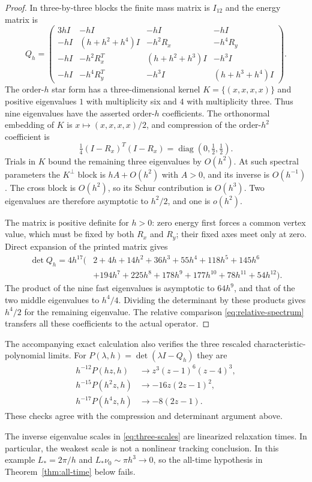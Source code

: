 \begin{proof}
In three-by-three blocks the finite mass matrix is
$I_{12}$ and the energy matrix is
\begin{equation}\label{eq:three-scale-matrix}
 Q_h=\begin{pmatrix}
 3hI&-hI&-hI&-hI\\
 -hI&(h+h^2+h^4)I&-h^2R_x&-h^4R_y\\
 -hI&-h^2R_x^T&(h+h^2+h^3)I&-h^3I\\
 -hI&-h^4R_y^T&-h^3I&(h+h^3+h^4)I
 \end{pmatrix}.
\end{equation}
The order-$h$ star form has a three-dimensional kernel
$K=\{(x,x,x,x)\}$ and positive eigenvalues $1$ with
multiplicity six and $4$ with multiplicity three.
Thus nine eigenvalues have the asserted order-$h$
coefficients. The orthonormal embedding of $K$ is
$x\mapsto(x,x,x,x)/2$, and compression of the
order-$h^2$ coefficient is
\[
 \tfrac14(I-R_x)^T(I-R_x)
 =\operatorname{diag}(0,\tfrac12,\tfrac12).
\]
Trials in $K$ bound the remaining three eigenvalues
by $O(h^2)$. At such spectral parameters the
$K^\perp$ block is $hA+O(h^2)$ with $A>0$, and
its inverse is $O(h^{-1})$. The cross block is
$O(h^2)$, so its Schur contribution is $O(h^3)$.
Two eigenvalues are therefore asymptotic to $h^2/2$,
and one is $o(h^2)$.

The matrix is positive definite for $h>0$: zero
energy first forces a common vertex value, which
must be fixed by both $R_x$ and $R_y$; their fixed
axes meet only at zero. Direct expansion of the
printed matrix gives
\begin{equation}\label{eq:three-scale-det}
 \begin{split}
 \det Q_h=4h^{17}\big(&2+4h+14h^2+36h^3+55h^4+118h^5
                  +145h^6\\
                  &+194h^7+225h^8+178h^9+177h^{10}
                    +78h^{11}+54h^{12}\big).
 \end{split}
\end{equation}
The product of the nine fast eigenvalues is
asymptotic to $64h^9$, and that of the two middle
eigenvalues to $h^4/4$. Dividing the determinant by
these products gives $h^4/2$ for the remaining
eigenvalue. The relative comparison
\eqref{eq:relative-spectrum} transfers all these
coefficients to the actual operator.
\end{proof}

The accompanying exact calculation also verifies the
three rescaled characteristic-polynomial limits. For
$P(\lambda,h)=\det(\lambda I-Q_h)$ they are
\[
 \begin{aligned}
 h^{-12}P(hz,h)&\longrightarrow z^3(z-1)^6(z-4)^3,\\
 h^{-15}P(h^2z,h)&\longrightarrow-16z(2z-1)^2,\\
 h^{-17}P(h^4z,h)&\longrightarrow-8(2z-1).
 \end{aligned}
\]
These checks agree with the compression and determinant
argument above.

The inverse eigenvalue scales in
\eqref{eq:three-scales} are linearized relaxation
times. In particular, the weakest scale is not a
nonlinear tracking conclusion. In this example
$L_*=2\pi/h$ and $L_*\nu_0\sim\pi h^3\to0$,
so the all-time hypothesis in
Theorem~\ref{thm:all-time} below fails.
